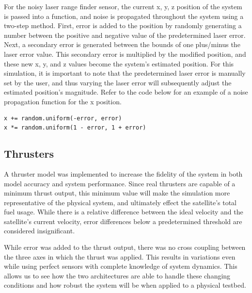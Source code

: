 \documentclass[journal, 10pt]{IEEEtran}
\begin{document}
For the noisy laser range finder sensor, the current x, y, z position of the system is passed into a function, and noise is propagated throughout the system using a two-step method. First, error is added to the position by randomly generating a number between the positive and negative value of the predetermined laser error. Next, a secondary error is generated between the bounds of one plus/minus the laser error value. This secondary error is multiplied by the modified position, and these new x, y, and z values become the system's estimated position.  For this simulation, it is important to note that the predetermined laser error is manually set by the user, and thus varying the laser error will subsequently adjust the estimated position's magnitude. Refer to the code below for an example of a noise propagation function for the x position.

\begin{verbatim}
x += random.uniform(-error, error)
x *= random.uniform(1 - error, 1 + error)
\end{verbatim}

\subsection{Thrusters}
A thruster model was implemented to increase the fidelity of the system in both model accuracy and system performance. Since real thrusters are capable of a minimum thrust output, this minimum value will make the simulation more representative of the physical system, and ultimately effect the satellite's total fuel usage. While there is a relative difference between the ideal velocity and the satellite's current velocity, error differences below a predetermined threshold are considered insignificant.

While error was added to the thrust output, there was no cross coupling between the three axes in which the thrust was applied. This results in variations even while using perfect sensors with complete knowledge of system dynamics.  This allows us to see how the two architectures are able to handle these changing conditions and how robust the system will be when applied to a physical testbed.
\end{document}
